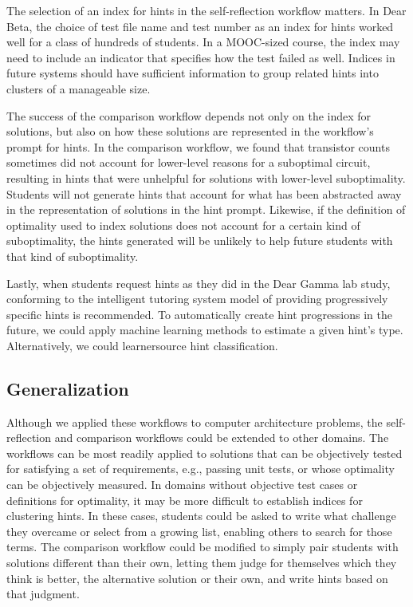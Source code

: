 The selection of an index for hints in the self-reflection workflow matters. In Dear Beta, the choice of test file name and test number as an index for hints worked well for a class of hundreds of students. In a MOOC-sized course, the index may need to include an indicator that specifies how the test failed as well. Indices in future systems should have sufficient information to group related hints into clusters of a manageable size.

The success of the comparison workflow depends not only on the index for solutions, but also on how these solutions are represented in the workflow's prompt for hints. In the comparison workflow, we found that transistor counts sometimes did not account for lower-level reasons for a suboptimal circuit, resulting in hints that were unhelpful for solutions with lower-level suboptimality. Students will not generate hints that account for what has been abstracted away in the representation of solutions in the hint prompt. Likewise, if the definition of optimality used to index solutions does not account for a certain kind of suboptimality, the hints generated will be unlikely to help future students with that kind of suboptimality. 

Lastly, when students request hints as they did in the Dear Gamma lab study, conforming to the intelligent tutoring system model of providing progressively specific hints is recommended. To automatically create hint progressions in the future, we could apply machine learning methods to estimate a given hint's type. Alternatively, we could learnersource hint classification. 

\subsection{Generalization}
Although we applied these workflows to computer architecture problems, the self-reflection and comparison workflows could be extended to other domains. The workflows can be most readily applied to solutions that can be objectively tested for satisfying a set of requirements, e.g., passing unit tests, or whose optimality can be objectively measured. In domains without objective test cases or definitions for optimality, it may be more difficult to establish indices for clustering hints. In these cases, students could be asked to write what challenge they overcame or select from a growing list, enabling others to search for those terms. The comparison workflow could be modified to simply pair students with solutions different than their own, letting them judge for themselves which they think is better, the alternative solution or their own, and write hints based on that judgment.

